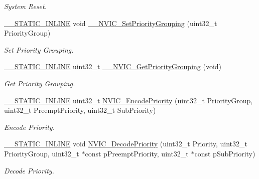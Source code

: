 \begin{DoxyCompactItemize}
\begin{DoxyCompactList}\small\item\em System Reset. \end{DoxyCompactList}\item 
\mbox{\hyperlink{cmsis__iccarm_8h_aba87361bfad2ae52cfe2f40c1a1dbf9c}{\+\_\+\+\_\+\+S\+T\+A\+T\+I\+C\+\_\+\+I\+N\+L\+I\+NE}} void \mbox{\hyperlink{group___c_m_s_i_s___core___n_v_i_c_functions_gafc94dcbaee03e4746ade1f5bb9aaa56d}{\+\_\+\+\_\+\+N\+V\+I\+C\+\_\+\+Set\+Priority\+Grouping}} (uint32\+\_\+t Priority\+Group)
\begin{DoxyCompactList}\small\item\em Set Priority Grouping. \end{DoxyCompactList}\item 
\mbox{\hyperlink{cmsis__iccarm_8h_aba87361bfad2ae52cfe2f40c1a1dbf9c}{\+\_\+\+\_\+\+S\+T\+A\+T\+I\+C\+\_\+\+I\+N\+L\+I\+NE}} uint32\+\_\+t \mbox{\hyperlink{group___c_m_s_i_s___core___n_v_i_c_functions_ga9b894af672df4373eb637f8288845c05}{\+\_\+\+\_\+\+N\+V\+I\+C\+\_\+\+Get\+Priority\+Grouping}} (void)
\begin{DoxyCompactList}\small\item\em Get Priority Grouping. \end{DoxyCompactList}\item 
\mbox{\hyperlink{cmsis__iccarm_8h_aba87361bfad2ae52cfe2f40c1a1dbf9c}{\+\_\+\+\_\+\+S\+T\+A\+T\+I\+C\+\_\+\+I\+N\+L\+I\+NE}} uint32\+\_\+t \mbox{\hyperlink{group___c_m_s_i_s___core___n_v_i_c_functions_gadb94ac5d892b376e4f3555ae0418ebac}{N\+V\+I\+C\+\_\+\+Encode\+Priority}} (uint32\+\_\+t Priority\+Group, uint32\+\_\+t Preempt\+Priority, uint32\+\_\+t Sub\+Priority)
\begin{DoxyCompactList}\small\item\em Encode Priority. \end{DoxyCompactList}\item 
\mbox{\hyperlink{cmsis__iccarm_8h_aba87361bfad2ae52cfe2f40c1a1dbf9c}{\+\_\+\+\_\+\+S\+T\+A\+T\+I\+C\+\_\+\+I\+N\+L\+I\+NE}} void \mbox{\hyperlink{group___c_m_s_i_s___core___n_v_i_c_functions_ga3387607fd8a1a32cccd77d2ac672dd96}{N\+V\+I\+C\+\_\+\+Decode\+Priority}} (uint32\+\_\+t Priority, uint32\+\_\+t Priority\+Group, uint32\+\_\+t $\ast$const p\+Preempt\+Priority, uint32\+\_\+t $\ast$const p\+Sub\+Priority)
\begin{DoxyCompactList}\small\item\em Decode Priority. \end{DoxyCompactList}\end{DoxyCompactItemize}


